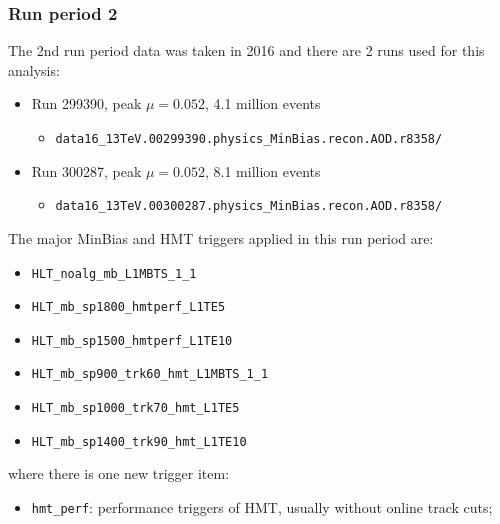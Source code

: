 \subsubsection{Run period 2}
The 2nd run period data was taken in 2016 and there are 2 runs used for this analysis:
\begin{itemize}

\item Run 299390, peak $\mu=0.052$, 4.1 million events
\begin{itemize}[leftmargin=*]
\item[] \verb|data16_13TeV.00299390.physics_MinBias.recon.AOD.r8358/|
\end{itemize}

\item Run 300287, peak $\mu=0.052$, 8.1 million events
\begin{itemize}[leftmargin=*]
\item[] \verb|data16_13TeV.00300287.physics_MinBias.recon.AOD.r8358/|
\end{itemize}

\end{itemize}
The major MinBias and HMT triggers applied in this run period are:
\begin{itemize}
\item \verb|HLT_noalg_mb_L1MBTS_1_1|
\item \verb|HLT_mb_sp1800_hmtperf_L1TE5|
\item \verb|HLT_mb_sp1500_hmtperf_L1TE10|
\item \verb|HLT_mb_sp900_trk60_hmt_L1MBTS_1_1|
\item \verb|HLT_mb_sp1000_trk70_hmt_L1TE5|
\item \verb|HLT_mb_sp1400_trk90_hmt_L1TE10|
\end{itemize}
where there is one new trigger item:
\begin{itemize}
\item \verb|hmt_perf|: performance triggers of HMT, usually without online track cuts;
\end{itemize}

